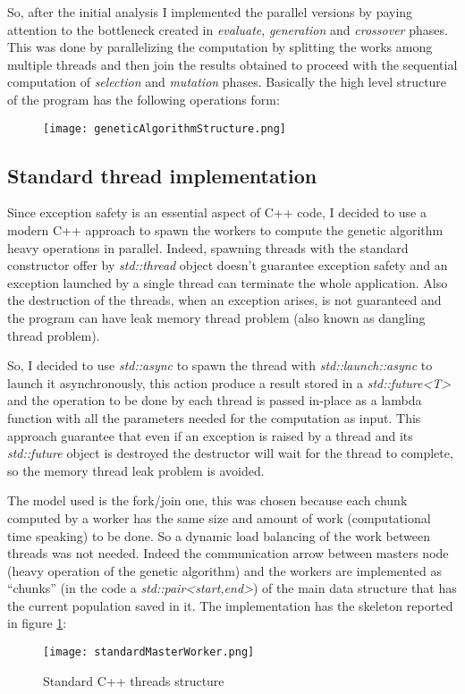 So, after the initial analysis I implemented the parallel versions by paying attention to the bottleneck created in \textit{evaluate}, \textit{generation} and \textit{crossover} phases. This was done by parallelizing the computation by splitting the works among multiple threads and then join the results obtained to proceed with the sequential computation of \textit{selection} and \textit{mutation} phases. Basically the high level structure of the program has the following operations form: 
\begin{figure}[H]
	\centering
	\texttt{[image: geneticAlgorithmStructure.png]}
\end{figure}
 
\subsection{Standard thread implementation}
Since exception safety is an essential aspect of C++ code, I decided to use a modern C++ approach to spawn the workers to compute the genetic algorithm heavy operations in parallel. Indeed, spawning threads with the standard constructor offer by \textit{std::thread} object doesn't guarantee exception safety and an exception launched by a single thread can terminate the whole application. Also the destruction of the threads, when an exception arises, is not guaranteed and the program can have leak memory thread problem (also known as dangling thread problem).

So, I decided to use \textit{std::async} to spawn the thread with \textit{std::launch::async} to launch it asynchronously, this action produce a result stored in a \textit{std::future<T>} and the operation to be done by each thread is passed in-place as a lambda function with all the parameters needed for the computation as input. This approach guarantee that even if an exception is raised by a thread and its \textit{std::future} object is destroyed the destructor will wait for the thread to complete, so the memory thread leak problem is avoided. 

The model used is the fork/join one, this was chosen because each chunk computed by a worker has the same size and amount of work (computational time speaking) to be done. So a dynamic load balancing of the work between threads was not needed. Indeed the communication arrow between masters node (heavy operation of the genetic algorithm) and the workers are implemented as ``chunks'' (in the code a \textit{std::pair<start,end>}) of the main data structure that has the current population saved in it. The implementation has the skeleton reported in figure \ref{fig:standardStructure}: 
\vspace{1.5em}
\begin{figure}[h]
	\centering
	\texttt{[image: standardMasterWorker.png]}
	\vspace{0.15em}
	\caption{Standard C++ threads structure}
	\label{fig:standardStructure}
\end{figure}
\vspace{1em}

